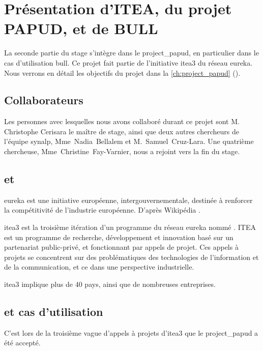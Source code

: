 \chapter{Présentation d'ITEA, du projet PAPUD, et de BULL}
La seconde partie du stage s'intègre dans le \gls{project_papud}, en particulier dans le cas d'utilisation \gls{bull}. Ce projet fait partie de l'initiative \gls{itea3} du réseau \gls{eureka}.
%
Nous verrons en détail les objectifs du projet dans la \autoref{ch:project_papud} ().


\section{Collaborateurs}\label{sec:papud_colabo}
Les personnes avec lesquelles nous avons collaboré durant ce projet sont M. Christophe Cerisara le maître de stage, ainsi que deux autres chercheurs de l'équipe \gls{synalp}, \mbox{Mme~Nadia~Bellalem} et \mbox{M.~Samuel~Cruz-Lara}.
Une quatrième chercheuse, \mbox{Mme~Christine~Fay-Varnier}, nous a rejoint vers la fin du stage.

\section{ et }
\og\gls{eureka} est une initiative européenne, intergouvernementale, destinée à renforcer la compétitivité de l’industrie européenne.\fg{} D'après Wikipédia \autocite{wiki_eureka}.

\gls{itea3} est la troisième itération d'un programme du réseau \gls{eureka} nommé .
ITEA est un programme de recherche, développement et innovation basé sur un partenariat public-privé, et fonctionnant par appels de projet.
Ces appels à projets se concentrent sur des problématiques des technologies de l'information et de la communication, et ce dans une perspective industrielle.

\gls{itea3} implique plus de 40 pays, ainsi que de nombreuses entreprises.

\pagebreak
\section{ et cas d'utilisation }
C'est lors de la troisième vague d'appels à projets d'\gls{itea3} que le  \gls{project_papud} a été accepté.

